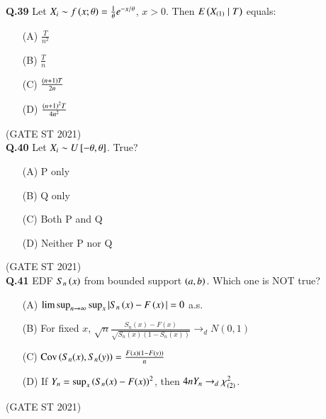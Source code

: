 \documentclass[journal,12pt,onecolumn]{IEEEtran}
\theoremstyle{remark}
\begin{document}
\textbf{Q.39}
Let $X_i \sim f\left(x;\theta\right) = \frac{1}{\theta} e^{-x/\theta}$, $x>0$. Then $E\left(X_{\left(1\right)} \mid T\right)$ equals:
\begin{enumerate}
\item[(A)] $\frac{T}{n^2}$

\item[(B)] $\frac{T}{n}$
\item[(C)] $\frac{\left(n+1\right)T}{2n}$
\item[(D)] $\frac{\left(n+1\right)^2T}{4n^2}$
\end{enumerate}
\hfill (GATE ST 2021) \\

\textbf{Q.40}
Let $X_i \sim U{}\left[-\theta,\theta\right]$. True?
\begin{enumerate}
\item[(A)] P only
\item[(B)] Q only
\item[(C)] Both P and Q
\item[(D)] Neither P nor Q
\end{enumerate}
\hfill (GATE ST 2021) \\
\textbf{Q.41}
EDF $S_n\left(x\right)$ from bounded support $\left(a,b\right)$. Which one is NOT true?
\begin{enumerate}
\item[(A)] $\limsup_{n\to\infty} \sup_x |S_n\left(x\right)-F\left(x\right)| = 0$ a.s.
\item[(B)] For fixed $x$, $\sqrt{n}\frac{S_n(x)-F(x)}{\sqrt{S_n(x)(1-S_n(x))}} \to_d N(0,1)$
\item[(C)] $\text{Cov}\left(S_n(x), S_n(y)\right) = \frac{F\left(x\right)\left(1-F\left(y\right)\right)}{n}$
\item[(D)] If $Y_n = \sup_x \left(S_n(x)-F(x)\right)^2$, then $4n Y_n \to_d \chi^2_{\left(2\right)}$.
\end{enumerate}
\hfill (GATE ST 2021) \\
\end{document}

